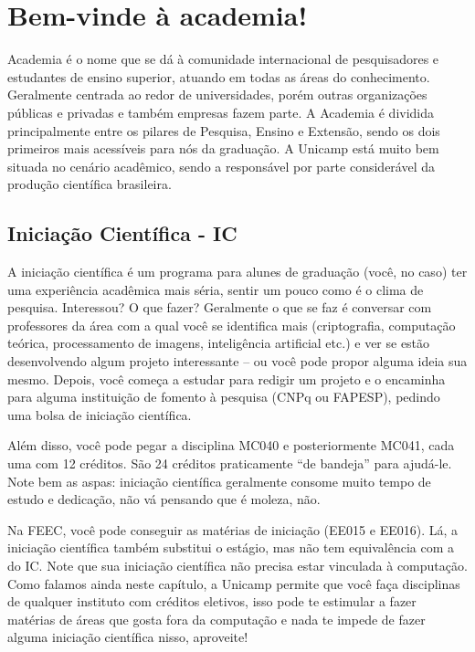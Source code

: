 \section{Bem-vinde à academia!}

Academia é o nome que se dá à comunidade internacional de pesquisadores e  estudantes de ensino superior, atuando em todas as áreas do conhecimento. Geralmente  centrada ao redor de universidades, porém outras organizações públicas e privadas e  também empresas fazem parte. A Academia é dividida principalmente entre os pilares de  Pesquisa, Ensino e Extensão, sendo os dois primeiros mais acessíveis para nós da  graduação. A Unicamp está muito bem situada no cenário acadêmico, sendo a  responsável por parte considerável da produção científica brasileira.

\subsection{Iniciação Científica - IC}

A iniciação científica é um programa para alunes de graduação (você, no caso) ter  uma experiência acadêmica mais séria, sentir um pouco como é o clima de pesquisa.  Interessou? O que fazer? Geralmente o que se faz é conversar com professores da área  com a qual você se identifica mais (criptografia, computação teórica, processamento de  imagens, inteligência artificial etc.) e ver se estão desenvolvendo algum projeto  interessante – ou você pode propor alguma ideia sua mesmo. Depois, você começa a  estudar para redigir um projeto e o encaminha para alguma instituição de fomento à  pesquisa (CNPq ou FAPESP), pedindo uma bolsa de iniciação científica.

Além disso, você pode pegar a disciplina MC040 e posteriormente MC041, cada uma  com 12 créditos. São 24 créditos praticamente “de bandeja” para ajudá-le. Note bem as  aspas: iniciação científica geralmente consome muito tempo de estudo e dedicação, não  vá pensando que é moleza, não.

Na FEEC, você pode conseguir as matérias de iniciação (EE015 e EE016). Lá, a  iniciação científica também substitui o estágio, mas não tem equivalência com a do IC. Note que sua iniciação científica não precisa estar vinculada à computação. Como  falamos ainda neste capítulo, a Unicamp permite que você faça disciplinas de qualquer  instituto com créditos eletivos, isso pode te estimular a fazer matérias de áreas que  gosta fora da computação e nada te impede de fazer alguma iniciação científica nisso,  aproveite!

